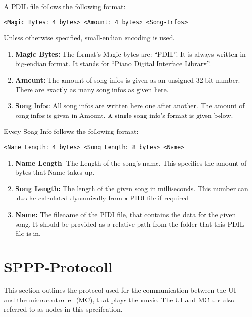 A PDIL file follows the following format:

\begin{verbatim}
<Magic Bytes: 4 bytes> <Amount: 4 bytes> <Song-Infos>
\end{verbatim}

Unless otherwise specified, small-endian encoding is used.

\begin{enumerate}
	\item \textbf{Magic Bytes:} The format's Magic bytes are: \enquote{PDIL}. It is always written in big-endian format. It stands for \enquote{Piano Digital Interface Library}.
	\item \textbf{Amount:} The amount of song infos is given as an unsigned 32-bit number. There are exactly as many song infos as given here.
	\item \textbf{Song }Infos: All song infos are written here one after another. The amount of song infos is given in Amount. A single song info's format is given below.
\end{enumerate}

Every Song Info follows the following format:

\begin{verbatim}
<Name Length: 4 bytes> <Song Length: 8 bytes> <Name>
\end{verbatim}

\begin{enumerate}
    \item \textbf{Name Length:} The Length of the song's name. This specifies the amount of bytes that Name takes up.
    \item \textbf{Song Length:} The length of the given song in milliseconds. This number can also be calculated dynamically from a PIDI file if required.
    \item \textbf{Name:} The filename of the PIDI file, that contains the data for the given song. It should be provided as a relative path from the folder that this PDIL file is in.
\end{enumerate}


\section{SPPP-Protocoll} \label{appendix-sppp}

This section outlines the protocol used for the communication between the UI and the microcontroller (MC), that plays the music. The UI and MC are also referred to as nodes in this specifcation.

